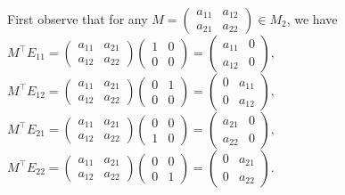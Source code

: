 \documentclass[12pt,a4paper]{article}
\theoremstyle{plain}
\theoremstyle{remark}
\theoremstyle{definition}
\begin{document}
	First observe that for any $M = \begin{pmatrix}
		a_{11} & a_{12} \\ a_{21} & a_{22}
	\end{pmatrix} \in M_2$, we have \\
	$M^{\intercal} E_{11} = \begin{pmatrix}
	a_{11} & a_{21} \\ a_{12} & a_{22}
	\end{pmatrix} \begin{pmatrix}
	1 & 0 \\ 0 & 0
	\end{pmatrix}
	= \begin{pmatrix}
	a_{11} & 0 \\ a_{12} & 0
	\end{pmatrix},$ $M^{\intercal}E_{12} = \begin{pmatrix}
	a_{11} & a_{21} \\ a_{12} & a_{22}
	\end{pmatrix} \begin{pmatrix}
	0 & 1 \\ 0 & 0
	\end{pmatrix}
	= \begin{pmatrix}
	0 & a_{11} \\ 0 & a_{12}
	\end{pmatrix},$\\
	$M^{\intercal}E_{21} = \begin{pmatrix}
	a_{11} & a_{21} \\ a_{12} & a_{22}
	\end{pmatrix}\begin{pmatrix}
	0 & 0 \\ 1 & 0
	\end{pmatrix}
	= \begin{pmatrix}
	a_{21} & 0 \\ a_{22} & 0
	\end{pmatrix},$ $M^{\intercal}E_{22} = \begin{pmatrix}
	a_{11} & a_{21} \\ a_{12} & a_{22}
	\end{pmatrix}\begin{pmatrix}
	0 & 0 \\ 0 & 1
	\end{pmatrix}
	= \begin{pmatrix}
	0 & a_{21} \\ 0 & a_{22}
	\end{pmatrix}$.\\
\end{document}
